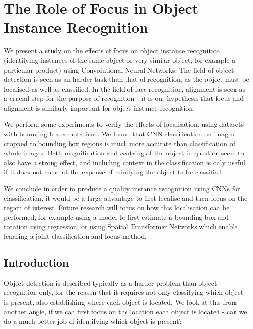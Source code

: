 
\chapter{The Role of Focus in Object Instance Recognition}
\label{chap:focus}



We present a study on the effects of focus on object instance recognition (identifying instances of the same object or very similar object, for example a particular product) using Convolutional Neural Networks. The field of object detection is seen as an harder task than that of recognition, as the object must be localised as well as classified. In the field of face recognition, alignment is seen as a crucial step for the purpose of recognition - it is our hypothesis that focus and alignment is similarly important for object instance recognition. 

We perform some experiments to verify the effects of localisation, using datasets with bounding box annotations. We found that CNN classification on images cropped to bounding box regions is much more accurate than classification of whole images. Both magnification and centring of the object in question seem to also have a strong effect, and including context in the classification is only useful if it does not come at the expense of minifying the object to be classified.
 
We conclude in order to produce a quality instance recognition using \gls{CNN}s for classification, it would be a large advantage to first localise and then focus on the region of interest. Future research will focus on how this localisation can be performed, for example using a model to first estimate a bounding box and rotation using regression, or using Spatial Transformer Networks which enable learning a joint classification and focus method.




\section{Introduction}

Object detection is described typically as a harder problem than object recognition only, for the reason that it requires not only classifying which object is present, also establishing where each object is located. We look at this from another angle, if we can first focus on the location each object is located - can we do a much better job of identifying which object is present? 

